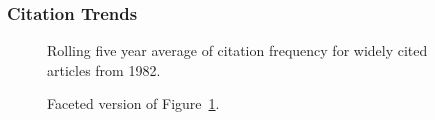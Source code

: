 \documentclass[
  10pt,
  letterpaper,
  DIV=11,
  numbers=noendperiod,
  twoside]{scrartcl}
\begin{document}
\subsubsection*{Citation Trends}\label{citation-trends-6}

\begin{figure}


\caption{\label{fig-citation-spaghetti-1982}Rolling five year average of
citation frequency for widely cited articles from 1982.}

\end{figure}%

\begin{figure}


\caption{\label{fig-citation-facet-1982}Faceted version of
Figure~\ref{fig-citation-spaghetti-1982}.}

\end{figure}%
\end{document}
